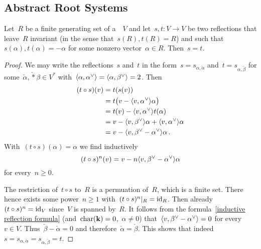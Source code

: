 




\subsection{Abstract Root Systems}


\begin{lemma}
  \label{uniqueness of reflections}
  Let~$R$ be a finite generating set of a~{\vectorspace{$\kf$}}~$V$ and let~$s, t \colon V \to V$ be two reflections that leave~$R$ invariant (in the sense that~$s(R), t(R) = R$) and such that~$s(\alpha), t(\alpha) = -\alpha$ for some nonzero vector~$\alpha \in R$.
  Then~$s = t$.
\end{lemma}


\begin{proof}
  We may write the reflections~$s$ and~$t$ in the form~$s = s_{\alpha, \check{\alpha}}$ and~$t = s_{\alpha, \check{\beta}}$ for some~$\check{\alpha}, \check*{\beta} \in V^*$ with~$\pair{\alpha, \check{\alpha}} = \pair{\alpha, \check{\beta}} = 2$.
  Then
  \begin{align*}
    (t \circ s)(v)
    &=
    t(s(v))
    \\
    &=
    t\bigl( v - \pair{v, \check{\alpha}} \alpha \bigr)
    \\
    &=
    t(v) - \pair{v, \check{\alpha}} t(\alpha)
    \\
    &=
    v - \pair{v, \check{\beta}} \alpha + \pair{v, \check{\alpha}} \alpha
    \\
    &=
    v - \pair{v, \check{\beta} - \check{\alpha}} \alpha \,.
  \end{align*}
  With~$(t \circ s)(\alpha) = \alpha$ we find inductively
  \begin{equation}
    \label{inductive reflection formula}
    (t \circ s)^n(v)
    =
    v - n \pair{v, \check{\beta} - \check{\alpha}} \alpha
  \end{equation}
  for every~$n \geq 0$.
  
  The restriction of~$t \circ s$ to~$R$ is a permuation of~$R$, which is a finite set.
  There hence exists some power~$n \geq 1$ with~$\restrict{(t \circ s)^n}{R} = \id_{R}$.
  Then already~$(t \circ s)^n = \operatorname{id}_V$ since~$V$ is spanned by~$R$.
  It follows from the formula~\eqref{inductive reflection formula} (and~$\operatorname{char}(\mathbf{k}) = 0$,~$\alpha \neq 0$) that~$\pair{v, \check{\beta} - \check{\alpha}} = 0$ for every~$v \in V$.
  Thus~$\check{\beta} - \check{\alpha} = 0$ and therefore~$\check{\alpha} = \check{\beta}$.
  This shows that indeed~$s = s_{\alpha, \check{\alpha}} = s_{\alpha, \check{\beta}} = t$.
\end{proof}



